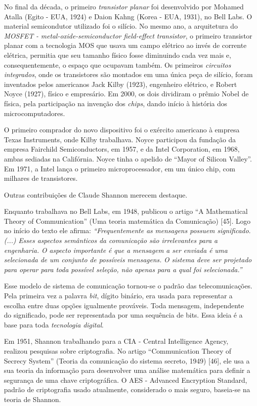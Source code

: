 \documentclass{hipatia}
\begin{document}
No final da década, o primeiro \textit{transistor planar} foi desenvolvido por Mohamed Atalla (Egito - EUA, 1924) e Daion Kahng (Korea - EUA, 1931), no Bell Labs. O material semicondutor utilizado foi o silício. No mesmo ano, a arquitetura do \textit{MOSFET - metal-oxide-semiconductor field-effect transistor}, o primeiro transistor planar com a tecnologia MOS que usava um campo elétrico ao invés de corrente elétrica,  permitia que seu tamanho físico fosse diminuindo cada vez mais e, consequentemente, o espaço que ocupavam também.
Os primeiros \textit{circuitos integrados}, onde os transistores são montados em uma única peça de silício, foram inventados pelos americanos Jack Kilby (1923), engenheiro elétrico, e Robert Noyce (1927), físico e empresário. Em 2000, os dois dividiram o prêmio Nobel de física, pela participação na invenção dos \textit{chips}, dando início à história dos microcomputadores.

O primeiro comprador do novo dispositivo foi o exército americano à empresa Texas Instruments, onde Kilby trabalhava. Noyce participou da fundação da empresa Fairchild Semiconductors, em 1957, e da Intel Corporation, em 1968, ambas sediadas na Califórnia. Noyce tinha o apelido de ``Mayor of Silicon Valley''. Em 1971, a Intel lança o primeiro microprocessador, em um único chip, com milhares de transistores.

Outras contribuições de Claude Shannon merecem destaque.

Enquanto trabalhava no Bell Labs, em 1948, publicou o artigo ``A Mathematical Theory of Communication'' (Uma teoria matemática da Comunicação) [45]. Logo no início do texto ele afirma: \textit{``Frequentemente as mensagens possuem significado. (...) Esses aspectos semânticos da comunicação são irrelevantes para a engenharia. O aspecto importante é que a mensagem a ser enviada é uma selecionada de um conjunto de possíveis mensagens. O sistema deve ser projetado para operar para toda possível seleção, não apenas para a qual foi selecionada.''}

Esse modelo de sistema de comunicação tornou-se o padrão das telecomunicações. Pela primeira vez a palavra \textit{bit}, dígito binário, era usada para representar a escolha entre duas opções igualmente prováveis. Toda mensagem, independente do significado, pode ser representada por uma sequência de bits. Essa ideia é a base para toda \textit{tecnologia digital}.

Em 1951, Shannon trabalhando para a CIA - Central Intelligence Agency, realizou pesquisas sobre criptografia. No artigo ``Communication Theory of Secrecy System'' (Teoria da comunicação do sistema secreto, 1949) [46], ele usa a sua teoria da informação para desenvolver uma análise matemática para definir a segurança de uma chave criptográfica. O AES - Advanced Encryption Standard, padrão de criptografia usado atualmente, considerado o mais seguro, baseia-se na teoria de Shannon.
\end{document}
